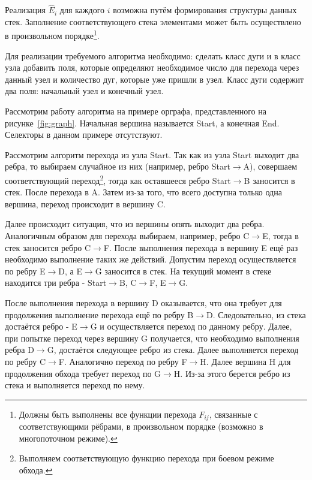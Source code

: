 \begin{remark}
Реализация $\hat{E}_i$ для каждого $i$ возможна путём формирования структуры данных стек. Заполнение соответствующего стека элементами может быть осуществлено в произвольном порядке\footnote{Должны быть выполнены все функции перехода $F_{ij}$, связанные с соответствующими рёбрами, в произвольном порядке (возможно в многопоточном режиме).}.
\end{remark}

Для реализации требуемого алгоритма необходимо: сделать класс дуги и в класс узла добавить поля, которые определяют необходимое число для перехода через данный узел и количество дуг, которые уже пришли в узел. Класс дуги содержит два поля: начальный узел и конечный узел.

Рассмотрим работу алгоритма на примере орграфа, представленного на рисунке~\ref{fig:graph}. Начальная вершина называется \textsf{Start}, а конечная \textsf{End}. Селекторы в данном примере отсутствуют.

Рассмотрим алгоритм перехода из узла \textsf{Start}. Так как из узла \textsf{Start} выходит два ребра, то выбираем случайное из них (например, ребро \textsf{Start$\rightarrow$A}), совершаем соответствующий переход\footnote{Выполняем соответствующую функцию перехода при \flqq боевом \frqq режиме обхода.}, тогда как оставшееся ребро \textsf{Start$\rightarrow$B} заносится в стек. После перехода в \textsf{A}.  Затем из-за того, что всего доступна только одна вершина, переход происходит в вершину \textsf{C}.

Далее происходит ситуация, что из вершины опять выходит два ребра. Аналогичным образом для перехода выбираем, например, ребро \textsf{C$\rightarrow$E}, тогда в стек заносится ребро \textsf{C$\rightarrow$F}. После выполнения перехода в вершину \textsf{E} ещё раз необходимо выполнение таких же действий. Допустим переход осуществляется по ребру \textsf{E$\rightarrow$D}, а \textsf{E$\rightarrow$G} заносится в стек. На текущий момент в стеке находится три ребра - \textsf{Start$\rightarrow$B}, \textsf{C$\rightarrow$F}, \textsf{E$\rightarrow$G}.

После выполнения перехода в вершину \textsf{D} оказывается, что она требует для продолжения выполнение перехода ещё по ребру \textsf{B$\rightarrow$D}. Следовательно, из стека достаётся ребро - \textsf{E$\rightarrow$G} и осуществляется переход по данному ребру. Далее, при попытке переход через вершину \textsf{G} получается, что необходимо выполнения ребра \textsf{D$\rightarrow$G}, достаётся следующее ребро из стека. Далее выполняется переход по ребру \textsf{C$\rightarrow$F}. Аналогично переход по ребру \textsf{F$\rightarrow$H}. Далее вершина \textsf{H} для продолжения обхода требует переход по \textsf{G$\rightarrow$H}. Из-за этого берется ребро из стека и выполняется переход по нему.

